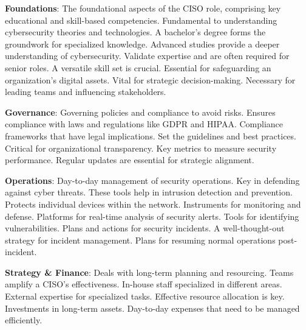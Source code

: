 

\textbf{Foundations}: The foundational aspects of the CISO role, comprising key educational and skill-based competencies.
Fundamental to understanding cybersecurity theories and technologies.
A bachelor's degree forms the groundwork for specialized knowledge.
Advanced studies provide a deeper understanding of cybersecurity.
Validate expertise and are often required for senior roles.
A versatile skill set is crucial.
Essential for safeguarding an organization's digital assets.
Vital for strategic decision-making.
Necessary for leading teams and influencing stakeholders.

\textbf{Governance}: Governing policies and compliance to avoid risks.
Ensures compliance with laws and regulations like GDPR and HIPAA.
Compliance frameworks that have legal implications.
Set the guidelines and best practices.
Critical for organizational transparency.
Key metrics to measure security performance.
Regular updates are essential for strategic alignment.

\textbf{Operations}: Day-to-day management of security operations.
Key in defending against cyber threats.
These tools help in intrusion detection and prevention.
Protects individual devices within the network.
Instruments for monitoring and defense.
Platforms for real-time analysis of security alerts.
Tools for identifying vulnerabilities.
Plans and actions for security incidents.
A well-thought-out strategy for incident management.
Plans for resuming normal operations post-incident.

\textbf{Strategy \& Finance}: Deals with long-term planning and resourcing.
Teams amplify a CISO's effectiveness.
In-house staff specialized in different areas.
External expertise for specialized tasks.
Effective resource allocation is key.
Investments in long-term assets.
Day-to-day expenses that need to be managed efficiently.
